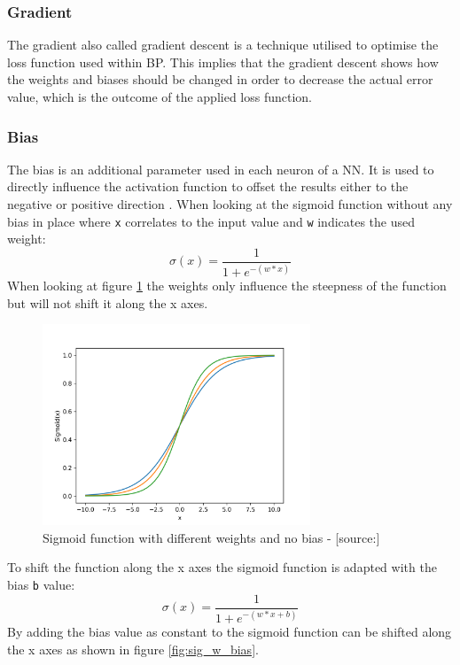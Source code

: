 \subsubsection{Gradient}
The gradient also called gradient descent is a technique utilised to optimise the loss function used within BP. 
This implies that the gradient descent shows how the weights and biases should be changed in order to decrease the actual error value, which is the outcome of the applied loss function.
 \cite{bp_basic}
\subsubsection{Bias}
The bias is an additional parameter used in each neuron of a NN. It is used to directly influence the activation function to offset the results either to the negative or positive direction \cite{bias}. When looking at the sigmoid function without any bias in place where \verb|x| correlates to the input value and \verb|w| indicates the used weight: 
\begin{equation}
 \sigma(x) = \frac{1} {1 + e^{-{(w*x)}}}
\label{eq:eq_4}
\end{equation}
When looking at figure \ref{fig:sig_wo_bias} the weights only influence the steepness of the function but will not shift it along the x axes.
\begin{figure}[H]
	\centering
		\includegraphics[width=8cm]{images/sigmoid_w_weights}
	\caption{Sigmoid function with different weights and no bias - [source:\cite{lstm_module}]}
	\label{fig:sig_wo_bias}
\end{figure}
 To shift the function along the x axes the sigmoid function is adapted with the bias \verb|b| value: 
\begin{equation}
 \sigma(x) = \frac{1} {1 + e^{-{(w*x+b)}}}
\label{eq:eq_4}
\end{equation}
By adding the bias value as constant to the sigmoid function can be shifted along the x axes as shown in figure \ref{fig:sig_w_bias}.
